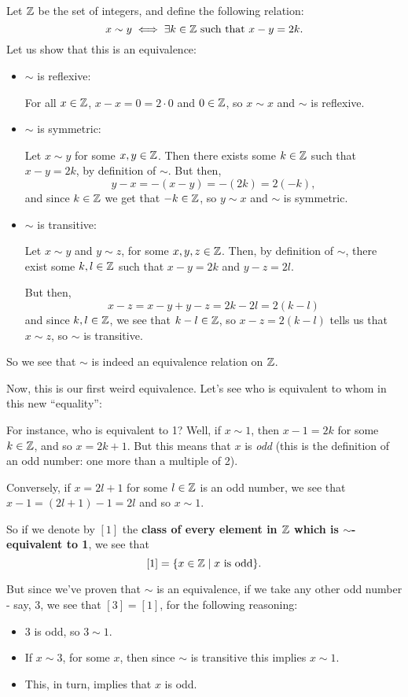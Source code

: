 \begin{ex}
	Let $\mathbb{Z}$ be the set of integers, and define the following relation:\[x\sim y\iff \exists k\in\mathbb{Z} \mbox{ such that }x-y=2k.\]Let us show that this is an equivalence:
	
	\begin{itemize}
		\item $\sim$ is reflexive:
		
		For all $x\in\mathbb{Z}$, $x-x=0=2\cdot 0$ and $0\in\mathbb{Z}$, so $x\sim x$ and $\sim$ is reflexive.
		
		\item $\sim$ is symmetric:
		
		Let $x\sim y$ for some $x,y\in \mathbb{Z}$. Then there exists some $k\in\mathbb{Z}$ such that $x-y=2k$, by definition of $\sim$. But then,
		\[y-x=-(x-y)=-(2k)=2(-k),\]and since $k\in\mathbb{Z}$ we get that $-k\in\mathbb{Z}$, so $y\sim x$ and $\sim$ is symmetric.
		
		\item $\sim$ is transitive:
		
		Let $x\sim y$ and $y\sim z$, for some $x,y,z\in \mathbb{Z}$. Then, by definition of $\sim$, there exist some $k,l\in\mathbb{Z}$ such that $x-y=2k$ and $y-z=2l$.
		
		But then,
		\[x-z=x-y+y-z=2k-2l=2(k-l)\]and since $k,l\in\mathbb{Z}$, we see that $k-l\in\mathbb{Z}$, so $x-z=2(k-l)$ tells us that $x\sim z$, so $\sim$ is transitive.
	\end{itemize}

So we see that $\sim$ is indeed an equivalence relation on $\mathbb{Z}$.

Now, this is our first weird equivalence. Let's see who is equivalent to whom in this new ``equality'':

For instance, who is equivalent to 1? Well, if $x\sim 1$, then $x-1=2k$ for some $k\in\mathbb{Z}$, and so $x=2k+1$. But this means that $x$ is \textit{odd} (this is the definition of an odd number: one more than a multiple of 2).

Conversely, if $x=2l+1$ for some $l\in\mathbb{Z}$ is an odd number, we see that $x-1=(2l+1)-1=2l$ and so $x\sim 1$.

So if we denote by $[1]$ the \textbf{class of every element in $\mathbb{Z}$ which is $\sim$-equivalent to 1}, we see that 
\[[1]=\{x\in\mathbb{Z}\mid x\mbox{ is odd}\}.\]

But since we've proven that $\sim$ is an equivalence, if we take any other odd number - say, 3, we see that $[3]=[1]$, for the following reasoning:
\begin{itemize}
	\item 3 is odd, so $3\sim 1$.
	\item If $x\sim 3$, for some $x$, then since $\sim$ is transitive this implies $x\sim 1$.
	\item This, in turn, implies that $x$ is odd.
\end{itemize}


\end{ex}
